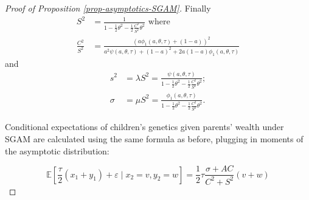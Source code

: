 \documentclass[
]{article}
\theoremstyle{definition}
\theoremstyle{definition}
\theoremstyle{definition}
\theoremstyle{definition}
\theoremstyle{remark}
\begin{document}
\begin{proof}[Proof of Proposition \ref{prop-asymptotics-SGAM}]
Finally
\begin{align*}
S^{2} & =\frac{1}{1-\frac{1}{2}\theta^{2}-\frac{1}{2}\frac{C^{2}}{S^{2}}\theta^{2}}\text{ where}\\
\frac{C^{2}}{S^{2}} & =\frac{\left(a\phi_{1}\left(a,\theta,\tau\right)+\left(1-a\right)\right)^{2}}{a^{2}\psi\left(a,\theta,\tau\right)+\left(1-a\right)^{2}+2a\left(1-a\right)\phi_{1}\left(a,\theta,\tau\right)}
\end{align*}
and
\begin{align*}
s^{2} & =\lambda S^{2}=\frac{\psi\left(a,\theta,\tau\right)}{1-\frac{1}{2}\theta^{2}-\frac{1}{2}\frac{C^{2}}{S^{2}}\theta^{2}};\\
\sigma & =\mu S^{2}=\frac{\phi_{1}\left(a,\theta,\tau\right)}{1-\frac{1}{2}\theta^{2}-\frac{1}{2}\frac{C^{2}}{S^{2}}\theta^{2}}.
\end{align*}

Conditional expectations of children's genetics given parents' wealth under SGAM
are calculated using the same formula as before, plugging in moments of the 
asymptotic distribution:

\[
\mathbb{E}\left[ \frac{\tau }{2}\left( x_{1}+y_{1}\right) +\varepsilon \mid
x_{2}=v,y_{2}=w\right]  = \frac{1}{2}\tau \frac{\sigma+AC%
}{C^{2}+S^{2}}\left( v+w\right)  
\]

\end{proof}
\end{document}
